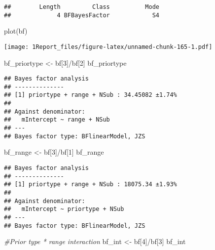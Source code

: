 \documentclass[
]{article}
\newenvironment{Shaded}{\begin{snugshade}}{\end{snugshade}}
\newcommand{\CommentTok}[1]{\textcolor[rgb]{0.56,0.35,0.01}{\textit{#1}}}
\newcommand{\DecValTok}[1]{\textcolor[rgb]{0.00,0.00,0.81}{#1}}
\newcommand{\FunctionTok}[1]{\textcolor[rgb]{0.00,0.00,0.00}{#1}}
\newcommand{\NormalTok}[1]{#1}
\newcommand{\OtherTok}[1]{\textcolor[rgb]{0.56,0.35,0.01}{#1}}
\newcommand{\SpecialCharTok}[1]{\textcolor[rgb]{0.00,0.00,0.00}{#1}}
\begin{document}
\begin{verbatim}
##        Length         Class          Mode 
##             4 BFBayesFactor            S4
\end{verbatim}

\begin{Shaded}
\begin{Highlighting}[]
\FunctionTok{plot}\NormalTok{(bf)}
\end{Highlighting}
\end{Shaded}

\texttt{[image: 1Report\_files/figure-latex/unnamed-chunk-165-1.pdf]}

\begin{Shaded}
\begin{Highlighting}[]
\NormalTok{ bf\_priortype }\OtherTok{\textless{}{-}}\NormalTok{ bf[}\DecValTok{3}\NormalTok{]}\SpecialCharTok{/}\NormalTok{bf[}\DecValTok{2}\NormalTok{]}
\NormalTok{ bf\_priortype}
\end{Highlighting}
\end{Shaded}

\begin{verbatim}
## Bayes factor analysis
## --------------
## [1] priortype + range + NSub : 34.45082 ±1.74%
## 
## Against denominator:
##   mIntercept ~ range + NSub 
## ---
## Bayes factor type: BFlinearModel, JZS
\end{verbatim}

\begin{Shaded}
\begin{Highlighting}[]
\NormalTok{bf\_range }\OtherTok{\textless{}{-}}\NormalTok{ bf[}\DecValTok{3}\NormalTok{]}\SpecialCharTok{/}\NormalTok{bf[}\DecValTok{1}\NormalTok{]}
\NormalTok{bf\_range}
\end{Highlighting}
\end{Shaded}

\begin{verbatim}
## Bayes factor analysis
## --------------
## [1] priortype + range + NSub : 18075.34 ±1.93%
## 
## Against denominator:
##   mIntercept ~ priortype + NSub 
## ---
## Bayes factor type: BFlinearModel, JZS
\end{verbatim}

\begin{Shaded}
\begin{Highlighting}[]
\CommentTok{\#Prior type * range interaction }
\NormalTok{bf\_int }\OtherTok{\textless{}{-}}\NormalTok{ bf[}\DecValTok{4}\NormalTok{]}\SpecialCharTok{/}\NormalTok{bf[}\DecValTok{3}\NormalTok{] }
\NormalTok{bf\_int}
\end{Highlighting}
\end{Shaded}
\end{document}
